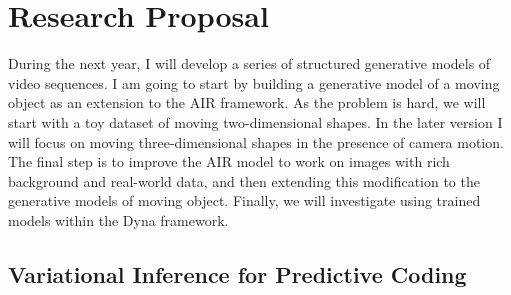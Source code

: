 \section{Research Proposal}
\label{sec:proposal}




    During the next year, I will develop a series of structured generative models of video sequences. I am going to start by building a generative model of a moving object as an extension to the AIR framework. As the problem is hard, we will start with a toy dataset of moving two-dimensional shapes. In the later version I will focus on moving three-dimensional shapes in the presence of camera motion. The final step is to improve the AIR model to work on images with rich background and real-world data, and then extending this modification to the generative models of moving object. Finally, we will investigate using trained models within the Dyna framework.
    
    
\subsection{Variational Inference for Predictive Coding}
\label{sec:pred}
   

